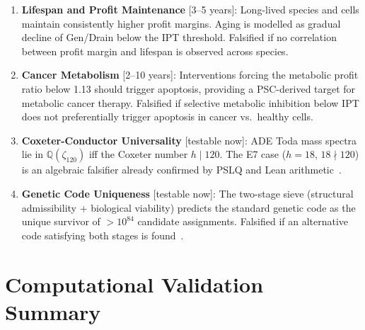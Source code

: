 \documentclass[11pt]{article}
\theoremstyle{plain}
\theoremstyle{definition}
\theoremstyle{remark}
\begin{document}
\begin{enumerate}[label=\arabic*.,leftmargin=2em]
\item \textbf{Lifespan and Profit Maintenance} [3--5 years]:
Long-lived species and cells maintain consistently higher profit margins.
Aging is modelled as gradual decline of Gen/Drain below the IPT threshold.
Falsified if no correlation between profit margin and lifespan is observed across species.

\item \textbf{Cancer Metabolism} [2--10 years]:
Interventions forcing the metabolic profit ratio below 1.13 should trigger apoptosis,
providing a PSC-derived target for metabolic cancer therapy.
Falsified if selective metabolic inhibition below IPT does not preferentially trigger
apoptosis in cancer vs.\ healthy cells.

\item \textbf{Coxeter-Conductor Universality} [testable now]:
ADE Toda mass spectra lie in $\mathbb{Q}(\zeta_{120})$ iff the Coxeter number $h \mid 120$.
The E7 case ($h = 18$, $18\nmid 120$) is an algebraic falsifier already confirmed
by PSLQ and Lean arithmetic~\cite{Spivack2025_BraidAtlas}.

\item \textbf{Genetic Code Uniqueness} [testable now]:
The two-stage sieve (structural admissibility $+$ biological viability) predicts
the standard genetic code as the unique survivor of $>10^{84}$ candidate assignments.
Falsified if an alternative code satisfying both stages is found~\cite{SpivackGeneticCode}.
\end{enumerate}

\section{Computational Validation Summary}
\label{sec:computation}
\end{document}
